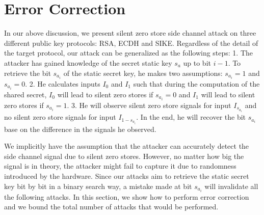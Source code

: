 \documentclass{iacrtrans}
\begin{document}
\section{Error Correction}
In our above discussion, we present silent zero store side channel attack on three different public key protocols: RSA, ECDH and SIKE. Regardless of the detail of the target protocol, our attack can be generalized as the following steps: 1. The attacker has gained knowledge of the secret static key $s_a$ up to bit $i-1$. To retrieve the bit $s_{a_i}$ of the static secret key, he makes two assumptions: $s_{a_i}=1$ and $s_{a_i}=0$. 2. He calculates inputs $I_0$ and $I_1$ such that during the computation of the shared secret, $I_0$ will lead to silent zero stores if $s_{a_i}=0$ and $I_1$ will lead to silent zero stores if $s_{a_i}=1$. 3. He will observe silent zero store signals for input $I_{s_{a_i}}$ and no silent zero store signals for input $I_{1-s_{a_i}}$. In the end, he will recover the bit $s_{a_i}$ base on the difference in the signals he observed. 

We implicitly have the assumption that the attacker can accurately detect the side channel signal due to silent zero stores. However, no matter how big the signal is in theory, the attacker might fail to capture it due to randomness introduced by the hardware. Since our attacks aim to retrieve the static secret key bit by bit in a binary search way, a mistake made at bit $s_{a_i}$ will invalidate all the following attacks. In this section, we show how to perform error correction and we bound the total number of attacks that would be performed. 
\end{document}
